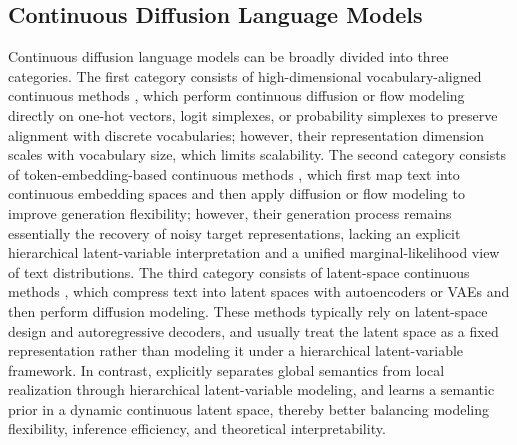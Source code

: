 \subsection{Continuous Diffusion Language Models}
Continuous diffusion language models can be broadly divided into three categories. The first category consists of high-dimensional vocabulary-aligned continuous methods \citep{han2023ssd,richemond2022categorical,mahabadi2024tess,jo2025continuous}, which perform continuous diffusion or flow modeling directly on one-hot vectors, logit simplexes, or probability simplexes to preserve alignment with discrete vocabularies; however, their representation dimension scales with vocabulary size, which limits scalability. The second category consists of token-embedding-based continuous methods \citep{li2022diffusion,strudel2022self,gao2024empowering,gong2022diffuseq,gulrajani2023likelihood,chen2023cheaper,lin2023text,dieleman2022continuous}, which first map text into continuous embedding spaces and then apply diffusion or flow modeling to improve generation flexibility; however, their generation process remains essentially the recovery of noisy target representations, lacking an explicit hierarchical latent-variable interpretation and a unified marginal-likelihood view of text distributions. The third category consists of latent-space continuous methods \citep{meshchaninov2025cosmos,kang2025ladir,lovelace2023latent,zhang2023planner}, which compress text into latent spaces with autoencoders or VAEs and then perform diffusion modeling. These methods typically rely on latent-space design and autoregressive decoders, and usually treat the latent space as a fixed representation rather than modeling it under a hierarchical latent-variable framework. In contrast, \method explicitly separates global semantics from local realization through hierarchical latent-variable modeling, and learns a semantic prior in a dynamic continuous latent space, thereby better balancing modeling flexibility, inference efficiency, and theoretical interpretability.